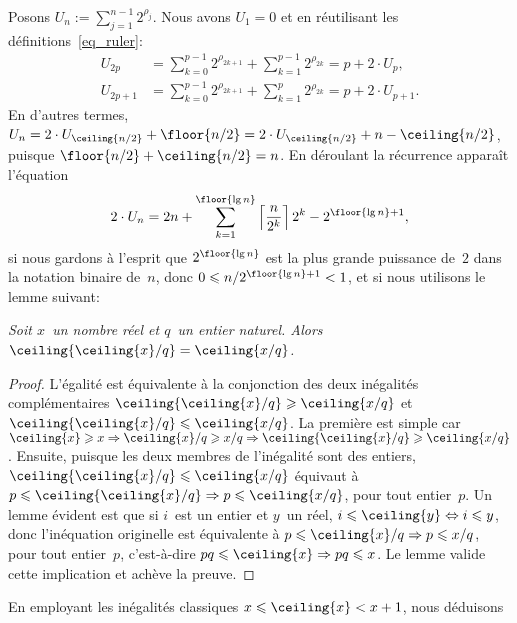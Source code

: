 Posons \(U_n := \sum_{j=1}^{n-1}2^{\rho_j}\). Nous avons \(U_1 = 0\) et
en réutilisant les définitions~\eqref{eq_ruler}:
\begin{align*}
U_{2p}   &= \sum_{k=0}^{p-1}2^{\rho_{2k+1}} + \sum_{k=1}^{p-1}2^{\rho_{2k}}
         = p + 2 \cdot U_p,\\
U_{2p+1} &= \sum_{k=0}^{p-1}2^{\rho_{2k+1}} + \sum_{k=1}^{p}2^{\rho_{2k}}
        = p + 2 \cdot U_{p+1}.
\end{align*}
En d'autres termes, \(U_n = 2 \cdot U_{\ceiling{n/2}} + \floor{n/2} =
2 \cdot U_{\ceiling{n/2}} + n - \ceiling{n/2}\), puisque \(\floor{n/2}
+ \ceiling{n/2} = n\). En déroulant la récurrence apparaît l'équation
\begin{equation*}
2 \cdot U_n = 2n + \sum_{k=1}^{\floor{\lg
    n}}\left\lceil{\frac{n}{2^k}}\right\rceil 2^k - 2^{\floor{\lg
    n}+1},
\end{equation*}
si nous gardons à l'esprit que \(2^{\floor{\lg n}}\) est la plus
grande puissance de~\(2\) dans la notation binaire de~\(n\), donc \(0
\leqslant n/2^{\floor{\lg n}+1} < 1\), et si nous utilisons le lemme suivant:
\begin{thm}
\label{thm_ceilings}
\textsl{Soit \(x\)~un nom\-bre réel et \(q\)~un entier naturel. Alors
  \(\ceiling{\ceiling{x}/q} = \ceiling{x/q}\).}
\end{thm}
\begin{proof}
  L'égalité est équivalente à la conjonction des deux inégalités
  complémentaires \(\ceiling{\ceiling{x}/q} \geqslant \ceiling{x/q}\)
  et \(\ceiling{\ceiling{x}/q} \leqslant \ceiling{x/q}\). La première
  est simple car \(\ceiling{x} \geqslant x \Rightarrow \ceiling{x}/q
  \geqslant x/q \Rightarrow \ceiling{\ceiling{x}/q} \geqslant
  \ceiling{x/q}\). Ensuite, puisque les deux membres de l'inégalité
  sont des entiers, \(\ceiling{\ceiling{x}/q} \leqslant
  \ceiling{x/q}\) équivaut à \(p \leqslant \ceiling{\ceiling{x}/q}
  \Rightarrow p \leqslant \ceiling{x/q}\), pour tout entier~\(p\). Un
  lemme évident est que si \(i\)~est un entier et \(y\)~un réel, \(i
  \leqslant \ceiling{y} \Leftrightarrow i \leqslant y\), donc
  l'inéquation originelle est équivalente à \(p \leqslant
  \ceiling{x}/q \Rightarrow p \leqslant x/q\), pour tout entier~\(p\),
  c'est-à-dire \(pq \leqslant \ceiling{x} \Rightarrow pq \leqslant
  x\). Le lemme valide cette implication et achève la preuve.
\end{proof}
\noindent En employant les inégalités classiques \(x \leqslant
\ceiling{x} < x + 1\), nous déduisons
